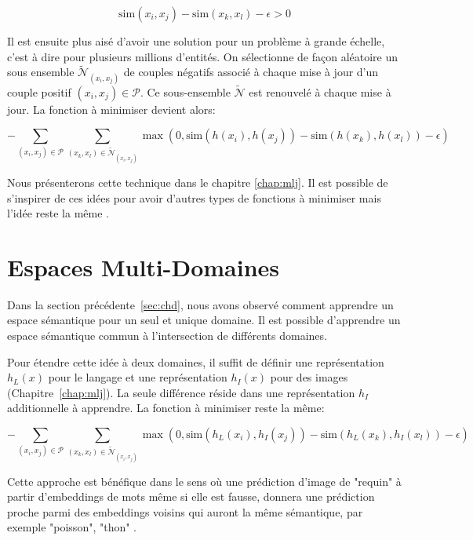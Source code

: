 \begin{equation}
\textrm{sim}(x_i, x_j) - \textrm{sim}(x_k, x_l) - \epsilon > 0
\end{equation}

Il est ensuite plus aisé d'avoir une solution pour un problème à grande
échelle, c'est à dire pour plusieurs millions d'entités. On sélectionne de
façon aléatoire un sous ensemble $\tilde{\mathcal{N}}_{(x_i, x_j)}$ de couples
négatifs associé à chaque mise à jour d'un couple positif $(x_i,
x_j)\in\mathcal{P}$.  Ce sous-ensemble $\tilde{\mathcal{N}}$ est renouvelé à
chaque mise à jour. La fonction à minimiser devient alors:  

\begin{equation}
-\sum_{(x_i, x_j)\in\mathcal{P}}\sum_{(x_k, x_l)\in\tilde{\mathcal{N}}_{(x_i, x_j)}} \max (0, \textrm{sim}(h(x_i), h(x_j)) - \textrm{sim}(h(x_k), h(x_l)) - \epsilon)
\label{eq:min-sim}
\end{equation}

Nous présenterons cette technique \citep{image-wsabie} dans le chapitre
\ref{chap:mlj}. Il est possible de s'inspirer de ces idées pour avoir d'autres
types de fonctions à minimiser mais l'idée reste la même \citep{rnn58}.

\section{Espaces Multi-Domaines}

Dans la section précédente~\ref{sec:chd}, nous avons observé comment apprendre un espace
sémantique pour un seul et unique domaine. Il est possible d'apprendre un espace
sémantique commun à l'intersection de différents domaines.  

Pour étendre cette idée à deux domaines, il suffit de définir une
représentation $h_L(x)$ pour le langage et une représentation $h_I(x)$ pour des images
(Chapitre~\ref{chap:mlj}). La seule différence réside dans une
représentation $h_I$ additionnelle à apprendre. La fonction à minimiser
reste la même:

 \begin{equation}
-\sum_{(x_i, x_j)\in\mathcal{P}}\sum_{(x_k, x_l)\in\tilde{\mathcal{N}}_{(x_i, x_j)}} \max (0, \textrm{sim}(h_L(x_i), h_I(x_j)) - \textrm{sim}(h_L(x_k), h_I(x_l)) - \epsilon)
\end{equation}

Cette approche est bénéfique dans le sens où une prédiction d'image de "requin"
à partir d'embeddings de mots même si elle est fausse, donnera une prédiction
proche parmi des embeddings voisins qui auront la même sémantique, par exemple
"poisson", "thon" \citep{samy-extreme}.


